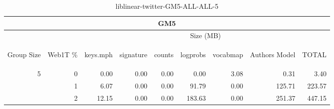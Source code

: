 \begin{center}
\begin{table}[htbp]
\begin{tabular}{ | r | r | r | r | r | r | r | r | r |}
\hline
\multicolumn{9}{|c|}{GM5}\\
\hline
 & & \multicolumn{7}{|c|}{Size (MB)}\\ \cline{3-9}
\begin{sideways}Group Size\end{sideways} & \begin{sideways}Web1T \% \end{sideways} & \begin{sideways}keys.mph\end{sideways} & \begin{sideways}signature\end{sideways} & \begin{sideways}counts\end{sideways} & \begin{sideways}logprobs\end{sideways} & \begin{sideways}vocabmap\end{sideways} & \begin{sideways}Authors Model \end{sideways} & \begin{sideways}TOTAL\end{sideways}\\
\hline
\multirow{2}{*}{5}
 & 0 & 0.00 & 0.00 & 0.00 & 0.00 & 3.08 & 0.31 & 3.40\\ \cline{2-9}
 & 1 & 6.07 & 0.00 & 0.00 & 91.79 & 0.00 & 125.71 & 223.57\\ \cline{2-9}
 & 2 & 12.15 & 0.00 & 0.00 & 183.63 & 0.00 & 251.37 & 447.15\\ \cline{2-9}
\hline
\end{tabular}
\caption{liblinear-twitter-GM5-ALL-ALL-5}
\label{table:liblinear-twitter-GM5-ALL-ALL-5}
\end{table}
\end{center}

